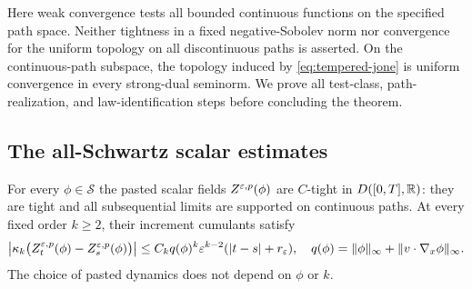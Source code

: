 Here weak convergence tests all bounded continuous functions on the
specified path space. Neither tightness in a fixed negative-Sobolev
norm nor convergence for the uniform topology on all discontinuous
paths is asserted. On the continuous-path subspace, the topology
induced by \eqref{eq:tempered-jone} is uniform convergence in every
strong-dual seminorm. We prove all test-class, path-realization,
and law-identification steps before concluding the theorem.

\subsection{The all-Schwartz scalar estimates}

\begin{lemma}\label{lem:tempered-scalar}
For every $\phi\in\mathcal S$ the pasted scalar fields
$Z^{\varepsilon,p}(\phi)$ are $C$-tight in $D([0,T],\mathbb R)$: they are tight
and all subsequential limits are supported on continuous paths.
At every fixed order $k\geq2$, their increment cumulants satisfy
\begin{equation}\label{eq:tempered-increments}
 \left|\kappa_k\bigl(Z_t^{\varepsilon,p}(\phi)-Z_s^{\varepsilon,p}(\phi)\bigr)\right|
 \leq C_k q(\phi)^k\varepsilon^{k-2}(|t-s|+r_\varepsilon),
 \quad
 q(\phi)=\|\phi\|_\infty+\|v\cdot\nabla_x\phi\|_\infty.
\end{equation}
The choice of pasted dynamics does not depend on $\phi$ or $k$.
\end{lemma}
